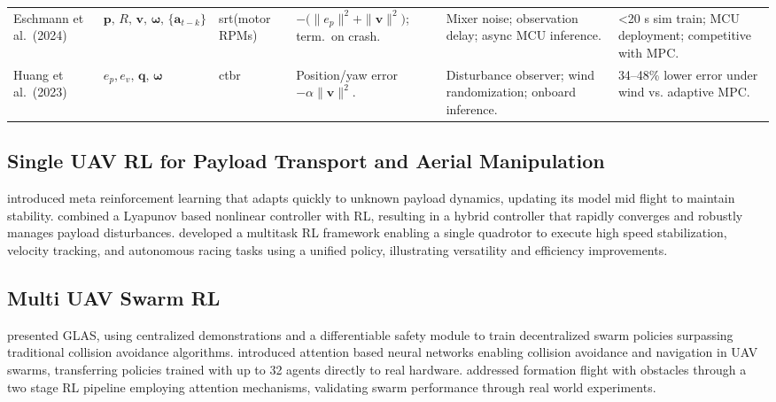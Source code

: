\begin{table*}[!b]
\begin{tabular}{p{2.0cm}<{\raggedright} p{2.5cm}<{\raggedright} p{2.0cm}<{\raggedright} p{3.0cm}<{\raggedright} p{2.8cm}<{\raggedright} p{2.7cm}<{\raggedright}}
Eschmann et al.\ (2024) \cite{eschmann_learning_2024} & $\mathbf{p},\,R,\,\mathbf{v},\,\boldsymbol{\omega},\,\{\mathbf{a}_{t-k}\}$ & \gls{srt}(motor RPMs) & { $-\bigl(\|e_p\|^2 + \|\mathbf{v}\|^2\bigr)$; term.\ on crash.} & { Mixer noise; observation delay; async MCU inference.} & { <20 s sim train; MCU deployment; competitive with MPC.} \\[1ex]

Huang et al.\ (2023) \cite{huang_quadswarm_2023} & $e_p,e_v,\,\mathbf{q},\,\boldsymbol{\omega}$ & \gls{ctbr}& { Position/yaw error $- \alpha\|\mathbf{v}\|^2$.} & { Disturbance observer; wind randomization; onboard inference.} & { 34–48\% lower error under wind vs. adaptive MPC.} \\
\hline
\end{tabular}
\end{table*}

\subsection{Single UAV RL for Payload Transport and Aerial Manipulation}
\cite{belkhale_model-based_2021} introduced meta reinforcement learning that adapts quickly to unknown payload dynamics, updating its model mid flight to maintain stability. \cite{hua_new_2022} combined a Lyapunov based nonlinear controller with RL, resulting in a hybrid controller that rapidly converges and robustly manages payload disturbances. \cite{xing_multi-task_2024} developed a multitask RL framework enabling a single quadrotor to execute high speed stabilization, velocity tracking, and autonomous racing tasks using a unified policy, illustrating versatility and efficiency improvements.

\subsection{Multi UAV Swarm RL}
\cite{riviere_glas_2020} presented GLAS, using centralized demonstrations and a differentiable safety module to train decentralized swarm policies surpassing traditional collision avoidance algorithms. \cite{huang_collision_2024} introduced attention based neural networks enabling collision avoidance and navigation in UAV swarms, transferring policies trained with up to 32 agents directly to real hardware. \cite{xie_multi-uav_2024} addressed formation flight with obstacles through a two stage RL pipeline employing attention mechanisms, validating swarm performance through real world experiments.

